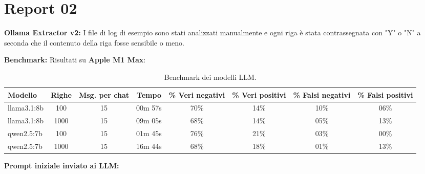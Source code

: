 \documentclass[12pt]{report}
\begin{document}
\section{Report 02}
\label{sec:report02}

\textbf{Ollama Extractor v2:}
I file di log di esempio sono stati analizzati manualmente e ogni riga è stata contrassegnata con "Y" o "N" a seconda che il contenuto della riga fosse sensibile o meno.

\textbf{Benchmark:}
Risultati su \textbf{Apple M1 Max}:

\begin{table}[h!]
    \centering
    \begin{tabular}{|l|c|c|c|c|c|c|c|}
        \hline
        \textbf{Modello} & \textbf{Righe} & \textbf{Msg. per chat} & \textbf{Tempo} & \textbf{\% Veri negativi} & \textbf{\% Veri positivi} & \textbf{\% Falsi negativi} & \textbf{\% Falsi positivi} \\ \hline
        llama3.1:8b      & 100            & 15                     & 00m 57s        & 70\%                      & 14\%                      & 10\%                       & 06\%                       \\ \hline
        llama3.1:8b      & 1000           & 15                     & 09m 05s        & 68\%                      & 14\%                      & 05\%                       & 13\%                       \\ \hline
        qwen2.5:7b       & 100            & 15                     & 01m 45s        & 76\%                      & 21\%                      & 03\%                       & 00\%                       \\ \hline
        qwen2.5:7b       & 1000           & 15                     & 16m 44s        & 68\%                      & 18\%                      & 01\%                       & 13\%                       \\ \hline
    \end{tabular}
    \caption{Benchmark dei modelli LLM.}
\end{table}

\textbf{Prompt iniziale inviato ai LLM:}
\end{document}
